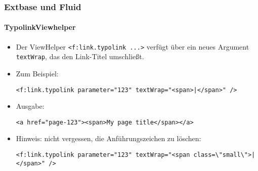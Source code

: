 %

\begin{frame}[fragile]
	\frametitle{Extbase und Fluid}
	\framesubtitle{TypolinkViewhelper}


	\begin{itemize}
		\item Der ViewHelper \texttt{<f:link.typolink ...>} verfügt über ein neues Argument
			\texttt{textWrap}, das den Link-Titel umschließt.

		\item Zum Beispiel:
\begin{lstlisting}
<f:link.typolink parameter="123" textWrap="<span>|</span>" />
\end{lstlisting}

		\item Ausgabe:
\begin{lstlisting}
<a href="page-123"><span>My page title</span></a>
\end{lstlisting}

		\item Hinweis: nicht vergessen, die Anführungszeichen zu löschen:
\begin{lstlisting}
<f:link.typolink parameter="123" textWrap="<span class=\"small\">|</span>" />
\end{lstlisting}

	\end{itemize}

\end{frame}

